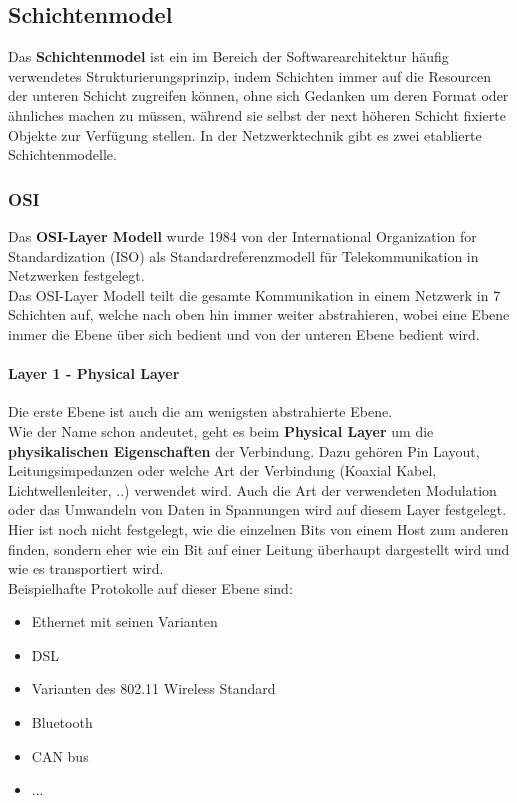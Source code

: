 \documentclass[12pt,a4paper]{report}
\begin{document}
\subsection{Schichtenmodel}
Das \textbf{Schichtenmodel} ist ein im Bereich der Softwarearchitektur häufig verwendetes Strukturierungsprinzip, indem Schichten immer auf die Resourcen der unteren Schicht zugreifen können, ohne sich Gedanken um deren Format oder ähnliches machen zu müssen, während sie selbst der next höheren Schicht fixierte Objekte zur Verfügung stellen. In der Netzwerktechnik gibt es zwei etablierte Schichtenmodelle.
\subsubsection{OSI}
Das \textbf{OSI-Layer Modell} wurde 1984 von der International Organization for Standardization (ISO) als Standardreferenzmodell für Telekommunikation in Netzwerken festgelegt.\\
Das OSI-Layer Modell teilt die gesamte Kommunikation in einem Netzwerk in 7 Schichten auf, welche nach oben hin immer weiter abstrahieren, wobei eine Ebene immer die Ebene über sich bedient und von der unteren Ebene bedient wird.\\
\paragraph{Layer 1 - Physical Layer}
Die erste Ebene ist auch die am wenigsten abstrahierte Ebene.\\
Wie der Name schon andeutet, geht es beim \textbf{Physical Layer} um die \textbf{physikalischen Eigenschaften} der Verbindung. Dazu gehören Pin Layout, Leitungsimpedanzen oder welche Art der Verbindung (Koaxial Kabel, Lichtwellenleiter, ..) verwendet wird. Auch die Art der verwendeten Modulation oder das Umwandeln von Daten in Spannungen wird auf diesem Layer festgelegt.\\
Hier ist noch nicht festgelegt, wie die einzelnen Bits von einem Host zum anderen finden, sondern eher wie ein Bit auf einer Leitung überhaupt dargestellt wird und wie es transportiert wird.\\

Beispielhafte Protokolle auf dieser Ebene sind:
\begin{itemize}
\item Ethernet mit seinen Varianten
\item DSL 
\item Varianten des 802.11 Wireless Standard
\item Bluetooth
\item CAN bus
\item ...
\end{itemize}
\end{document}
